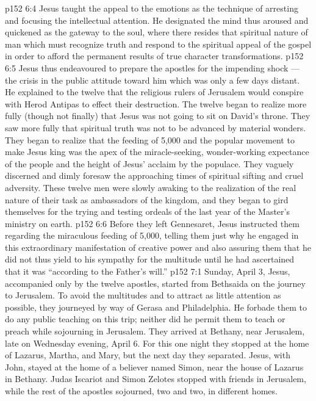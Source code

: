 \vs p152 6:4 \pc Jesus taught the appeal to the emotions as the technique of arresting and focusing the intellectual attention. He designated the mind thus aroused and quickened as the gateway to the soul, where there resides that spiritual nature of man which must recognize truth and respond to the spiritual appeal of the gospel in order to afford the permanent results of true character transformations.
\vs p152 6:5 Jesus thus endeavoured to prepare the apostles for the impending shock --- the crisis in the public attitude toward him which was only a few days distant. He explained to the twelve that the religious rulers of Jerusalem would conspire with Herod Antipas to effect their destruction. The twelve began to realize more fully (though not finally) that Jesus was not going to sit on David’s throne. They saw more fully that spiritual truth was not to be advanced by material wonders. They began to realize that the feeding of 5,000 and the popular movement to make Jesus king was the apex of the miracle\hyp{}seeking, wonder\hyp{}working expectance of the people and the height of Jesus’ acclaim by the populace. They vaguely discerned and dimly foresaw the approaching times of spiritual sifting and cruel adversity. These twelve men were slowly awaking to the realization of the real nature of their task as ambassadors of the kingdom, and they began to gird themselves for the trying and testing ordeals of the last year of the Master’s ministry on earth.
\vs p152 6:6 \pc Before they left Gennesaret, Jesus instructed them regarding the miraculous feeding of 5,000, telling them just why he engaged in this extraordinary manifestation of creative power and also assuring them that he did not thus yield to his sympathy for the multitude until he had ascertained that it was “according to the Father’s will.”
\vs p152 7:1 Sunday, April 3, Jesus, accompanied only by the twelve apostles, started from Bethsaida on the journey to Jerusalem. To avoid the multitudes and to attract as little attention as possible, they journeyed by way of Gerasa and Philadelphia. He forbade them to do any public teaching on this trip; neither did he permit them to teach or preach while sojourning in Jerusalem. They arrived at Bethany, near Jerusalem, late on Wednesday evening, April 6. For this one night they stopped at the home of Lazarus, Martha, and Mary, but the next day they separated. Jesus, with John, stayed at the home of a believer named Simon, near the house of Lazarus in Bethany. Judas Iscariot and Simon Zelotes stopped with friends in Jerusalem, while the rest of the apostles sojourned, two and two, in different homes.
